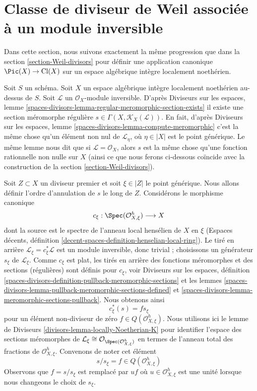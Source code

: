 \section{Classe de diviseur de Weil associée à un module inversible}
\label{section-c1}

\noindent
Dans cette section, nous suivons exactement la même progression que dans la
section \ref{section-Weil-divisors} pour définir une application canonique
$\Pic(X) \to \text{Cl}(X)$
sur un espace algébrique intègre localement noethérien.

\medskip\noindent
Soit $S$ un schéma. Soit $X$ un espace algébrique intègre localement noethérien
au-dessus de $S$. Soit $\mathcal{L}$ un $\mathcal{O}_X$-module inversible.
D'après Diviseurs sur les espaces, lemme
\ref{spaces-divisors-lemma-regular-meromorphic-section-exists}
il existe une section méromorphe régulière
$s \in \Gamma(X, \mathcal{K}_X(\mathcal{L}))$.
En fait, d'après Diviseurs sur les espaces, lemme
\ref{spaces-divisors-lemma-compute-meromorphic}
c'est la même chose qu'un élément non nul de
$\mathcal{L}_\eta$, où $\eta \in |X|$ est le point générique.
Le même lemme nous dit que si $\mathcal{L} = \mathcal{O}_X$,
alors $s$ est la même chose qu'une fonction rationnelle non nulle sur $X$
(ainsi ce que nous ferons ci-dessous coïncide avec la construction de la
section \ref{section-Weil-divisors}).

\medskip\noindent
Soit $Z \subset X$ un diviseur premier et soit $\xi \in |Z|$ le point générique.
Nous allons définir l'ordre d'annulation de $s$ le long de $Z$.
Considérons le morphisme canonique
$$
c_\xi : \Spec(\mathcal{O}_{X, \xi}^h) \longrightarrow X
$$
dont la source est le spectre de l'anneau local hensélien de $X$ en $\xi$
(Espaces décents, définition \ref{decent-spaces-definition-henselian-local-ring}).
Le tiré en arrière $\mathcal{L}_\xi = c_\xi^*\mathcal{L}$
est un module inversible, donc trivial ; choisissons un générateur $s_\xi$ de
$\mathcal{L}_\xi$. Comme $c_\xi$ est plat, les tirés en arrière des fonctions méromorphes
et des sections (régulières) sont définis pour $c_\xi$, voir
Diviseurs sur les espaces, définition
\ref{spaces-divisors-definition-pullback-meromorphic-sections} et
les lemmes \ref{spaces-divisors-lemma-pullback-meromorphic-sections-defined} et
\ref{spaces-divisors-lemma-meromorphic-sections-pullback}.
Nous obtenons ainsi
$$
c_\xi^*(s) = f s_\xi
$$
pour un élément non-diviseur de zéro $f \in Q(\mathcal{O}_{X, \xi}^h)$.
Nous utilisons ici le lemme de Diviseurs \ref{divisors-lemma-locally-Noetherian-K}
pour identifier l'espace des sections méromorphes de
$\mathcal{L}_\xi \cong \mathcal{O}_{\Spec(\mathcal{O}_{X, \xi}^h)}$
en termes de l'anneau total des fractions de $\mathcal{O}_{X, \xi}^h$.
Convenons de noter cet élément
$$
s/s_\xi = f \in  Q(\mathcal{O}_{X, \xi}^h)
$$
Observons que $f = s/s_\xi$
est remplacé par $uf$ où $u \in \mathcal{O}_{X, \xi}^h$
est une unité lorsque nous changeons le choix de $s_\xi$.

